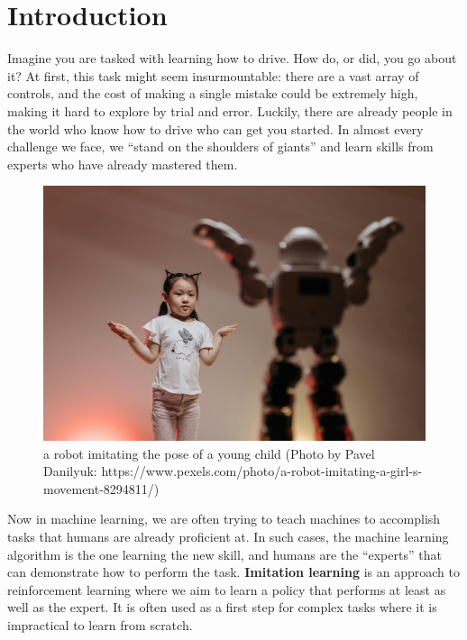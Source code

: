 \documentclass[
  letterpaper,
  DIV=11,
  numbers=noendperiod]{scrreprt}
\theoremstyle{plain}
\theoremstyle{plain}
\theoremstyle{definition}
\theoremstyle{definition}
\theoremstyle{remark}
\begin{document}
\providecommand{\hi}{h}
\providecommand{\hor}{H}
\providecommand{\kl}[2]{\mathrm{KL}\left(#1\parallel#2\right)}
\providecommand{\ind}[1]{\mathbf{1}\left\{#1\right\}}
\providecommand{\st}{s}
\providecommand{\act}{a}
\providecommand{\E}{\mathbb{E}}
\providecommand{\R}{\mathbb{R}}
\providecommand{\pr}{\mathbb{P}}

\section{Introduction}\label{introduction-7}

Imagine you are tasked with learning how to drive. How do, or did, you
go about it? At first, this task might seem insurmountable: there are a
vast array of controls, and the cost of making a single mistake could be
extremely high, making it hard to explore by trial and error. Luckily,
there are already people in the world who know how to drive who can get
you started. In almost every challenge we face, we ``stand on the
shoulders of giants'' and learn skills from experts who have already
mastered them.

\begin{figure}[H]

{\centering \includegraphics{./shared/robot-imitation-learning.jpg}

}

\caption{a robot imitating the pose of a young child (Photo by Pavel
Danilyuk:
https://www.pexels.com/photo/a-robot-imitating-a-girl-s-movement-8294811/)}

\end{figure}%

Now in machine learning, we are often trying to teach machines to
accomplish tasks that humans are already proficient at. In such cases,
the machine learning algorithm is the one learning the new skill, and
humans are the ``experts'' that can demonstrate how to perform the task.
\textbf{Imitation learning} is an approach to reinforcement learning
where we aim to learn a policy that performs at least as well as the
expert. It is often used as a first step for complex tasks where it is
impractical to learn from scratch.
\end{document}
